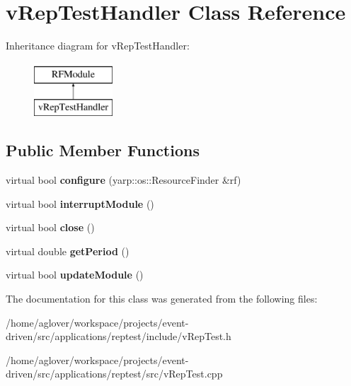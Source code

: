 \hypertarget{classvRepTestHandler}{}\section{v\+Rep\+Test\+Handler Class Reference}
\label{classvRepTestHandler}
Inheritance diagram for v\+Rep\+Test\+Handler\+:\begin{figure}[H]
\begin{center}
\leavevmode
\includegraphics[height=2.000000cm]{classvRepTestHandler}
\end{center}
\end{figure}
\subsection*{Public Member Functions}
\begin{DoxyCompactItemize}
\item 
virtual bool {\bfseries configure} (yarp\+::os\+::\+Resource\+Finder \&rf)\hypertarget{classvRepTestHandler_a75d6ab4e2998eccf96b0f90b53d183f3}{}\label{classvRepTestHandler_a75d6ab4e2998eccf96b0f90b53d183f3}

\item 
virtual bool {\bfseries interrupt\+Module} ()\hypertarget{classvRepTestHandler_aa67c736991dc0601e5775b8f60b680be}{}\label{classvRepTestHandler_aa67c736991dc0601e5775b8f60b680be}

\item 
virtual bool {\bfseries close} ()\hypertarget{classvRepTestHandler_ad40900db7b64a3b8539834ff18ddc2c1}{}\label{classvRepTestHandler_ad40900db7b64a3b8539834ff18ddc2c1}

\item 
virtual double {\bfseries get\+Period} ()\hypertarget{classvRepTestHandler_a53456bbfb2edf31921b6b775b3bc1119}{}\label{classvRepTestHandler_a53456bbfb2edf31921b6b775b3bc1119}

\item 
virtual bool {\bfseries update\+Module} ()\hypertarget{classvRepTestHandler_a307f808f4e474d8b7c352e346cbda80b}{}\label{classvRepTestHandler_a307f808f4e474d8b7c352e346cbda80b}

\end{DoxyCompactItemize}


The documentation for this class was generated from the following files\+:\begin{DoxyCompactItemize}
\item 
/home/aglover/workspace/projects/event-\/driven/src/applications/reptest/include/v\+Rep\+Test.\+h\item 
/home/aglover/workspace/projects/event-\/driven/src/applications/reptest/src/v\+Rep\+Test.\+cpp\end{DoxyCompactItemize}
